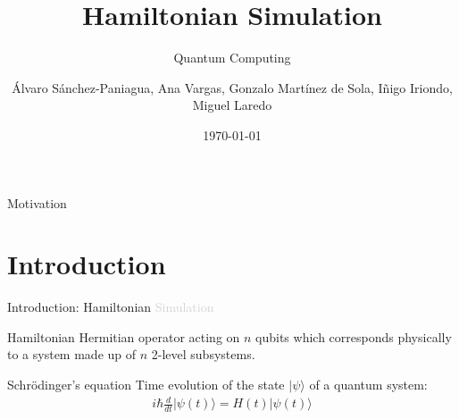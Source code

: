 \documentclass[aspectratio=169,xcolor=dvipsnames]{beamer}
\title{Hamiltonian Simulation}
\subtitle{Quantum Computing}
\author{Álvaro Sánchez-Paniagua, Ana Vargas, Gonzalo Martínez de Sola, Iñigo Iriondo, Miguel Laredo}
\institute
{
    Based on the notes from Ashley Montaro %
}
\date{\today} %
\begin{document}
\begin{frame}
    \titlepage
\end{frame}

\begin{frame}{Motivation}
\end{frame}








\section{Introduction}
\begin{frame}{Introduction: Hamiltonian \textcolor{lightgray}{Simulation}}
    \begin{block}{Hamiltonian}
        Hermitian operator acting on $n$ qubits which corresponds physically to a system made up of $n$ 2-level subsystems.
    \end{block}
    \begin{block}{Schrödinger’s equation}
        Time evolution of the state $|\psi\rangle$ of a quantum system:
        \begin{align*}
            i \hbar \frac{d}{dt}|\psi(t)\rangle = H(t)|\psi(t)\rangle
        \end{align*}
    \end{block}
\end{frame}
\end{document}
